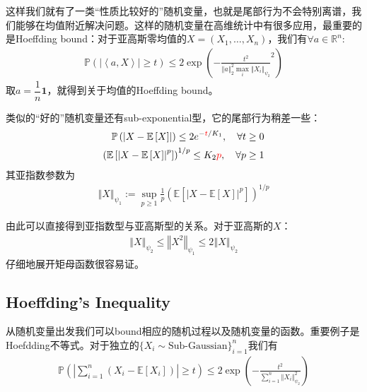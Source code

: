 \documentclass[11pt,a4paper]{ctexart}
\numberwithin{equation}{section}%
\begin{document}
这样我们就有了一类“性质比较好的”随机变量，也就是尾部行为不会特别离谱，我们能够在均值附近解决问题。这样的随机变量在高维统计中有很多应用，最重要的是Hoeffding bound：对于亚高斯零均值的$X=(X_1,\ldots,X_n)$，我们有$ \forall a\in \mathbb{R}^n $:
\begin{align*}
     \mathbb{P}\left( \left\vert \left\langle a,X \right\rangle  \right\vert \geq t  \right) \leq 2 \exp\left( -\frac{t^2}{\left\Vert a \right\Vert _2^2 \max_i \left\Vert X_i \right\Vert _{\psi_2} }^2 \right)
\end{align*}
取$a = \dfrac{ 1 }{ n } \mathbf{1}$，就得到关于均值的Hoeffding bound。

类似的“好的”随机变量还有sub-exponential型，它的尾部行为稍差一些：
\begin{align*}
    \mathbb{P}\left( \left\vert X-\mathbb{E}\left[ X \right]  \right\vert  \right) \leq 2e^{-{\color{red}t}/K_1},\quad \forall t \geq 0 \\
    \left( \mathbb{E}\left[ \left\vert X - \mathbb{E}\left[ X \right]  \right\vert^p \right] \right)^{1/p} \leq K_2{\color{red}p},\quad \forall p \geq 1
\end{align*}
其亚指数参数为
\begin{align*}
    \left\Vert X \right\Vert _{\psi_1} := \sup_{p\geq 1} \frac{1}{p} \left( \mathbb{E}\left[ \left\vert X - \mathbb{E}\left[ X \right]  \right\vert^p \right] \right)^{1/p}
\end{align*}

由此可以直接得到亚指数型与亚高斯型的关系。对于亚高斯的$X$：
\begin{align*}
    \left\Vert X \right\Vert _{\psi_2} \leq \left\Vert X^2 \right\Vert _{\psi_1} \leq 2 \left\Vert X \right\Vert _{\psi_2}
\end{align*}
仔细地展开矩母函数很容易证。

\subsection{Hoeffding's Inequality}
从随机变量出发我们可以bound相应的随机过程以及随机变量的函数。重要例子是Hoefdding不等式。对于独立的$ \{X_i\sim \text{Sub-Gaussian}\}_{i=1}^n $我们有
\begin{align*}
    \mathbb{P}\left( \left\vert \sum_{i=1}^n( X_i - \mathbb{E}\left[X_i \right])  \right\vert \geq t \right) \leq  2\exp\left( -\frac{t^2}{\sum_{i=1}^n \left\Vert X_i \right\Vert _{\psi_2}^2} \right) 
\end{align*}
\end{document}
